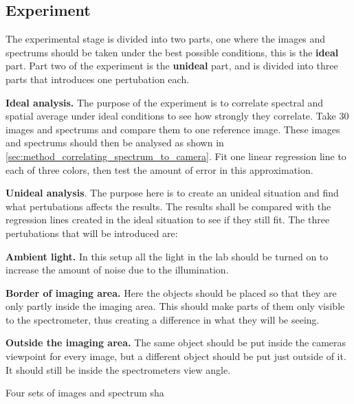 \subsection{Experiment}
\label{sec:experiment}

The experimental stage is divided into two parts, one where the images and spectrums should be taken under the best possible conditions, this is the \textbf{ideal} part. Part two of the experiment is the \textbf{unideal} part, and is divided into three parts that introduces one pertubation each.

\textbf{Ideal analysis.} The purpose of the experiment is to correlate spectral and spatial average under ideal conditions to see how strongly they correlate. Take 30 images and spectrums and compare them to one reference image. These images and spectrums should then be analysed as shown in \ref{sec:method_correlating_spectrum_to_camera}. Fit one linear regression line to each of three colors, then test the amount of error in this approximation. 

\textbf{Unideal analysis}. The purpose here is to create an unideal situation and find what pertubations affects the results. The results shall be compared with the regression lines created in the ideal situation to see if they still fit. The three pertubations that will be introduced are:

\textbf{Ambient light.} In this setup all the light in the lab should be turned on to increase the amount of noise due to the illumination.

\textbf{Border of imaging area.} Here the objects should be placed so that they are only partly inside the imaging area. This should make parts of them only visible to the spectrometer, thus creating a difference in what they will be seeing. 

\textbf{Outside the imaging area.} The same object should be put inside the cameras viewpoint for every image, but a different object should be put just outside of it. It should still be inside the spectrometers view angle.


Four sets of images and spectrum sha